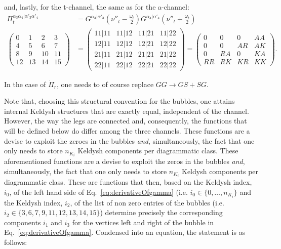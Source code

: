 \documentclass[12pt,a4paper,roman]{article}
\begin{document}
and, lastly, for the t-channel, the same as for the a-channel:
\begin{align}
\Pi_t^{\alpha_3\alpha_4|\alpha'_3\alpha'_4} &= G^{\alpha_3|\alpha'_3}\left(\nu''_t-\frac{\omega_t}{2}\right)G^{\alpha_4|\alpha'_4}\left(\nu''_t+\frac{\omega_t}{2}\right)\\
\begin{pmatrix}
0  & 1  & 2   & 3\\
4  & 5  & 6   & 7\\
8  & 9  & 10 & 11\\
12& 13&14 & 15
\end{pmatrix} &=
\begin{pmatrix}
11|11 & 11|12 & 11|21 & 11|22 \\
12|11 & 12|12 & 12|21 & 12|22\\
21|11 & 21|12 & 21|21 & 21|22\\
22|11 & 22|12 & 22|21 & 22|22
\end{pmatrix} = \begin{pmatrix}
0    & 0    & 0    & AA \\
0    & 0    & AR & AK\\
0    & RA & 0    & KA\\
RR & RK & KR & KK
\end{pmatrix}.
\label{eq:Pit}
\end{align}

In the case of $\dot{\Pi}_r$, one needs to of course replace $GG \rightarrow GS+SG$.

Note that, choosing this structural convention for the bubbles, one attains internal Keldysh structures that are exactly equal, independent of the channel. However, the way the legs are connected and, consequently, the functions that will be defined below do differ among the three channels. These functions are a devise to exploit the zeroes in the bubbles \textit{and}, simultaneously, the fact that one only needs to store $n_{K_i}$ Keldysh components per diagrammatic class.
These aforementioned functions are a devise to exploit the zeros in the bubbles \textit{and}, simultaneously, the fact that one only needs to store $n_{K_i}$ Keldysh components per diagrammatic class. These are functions that then, based on the Keldysh index, $i_0$, of the left hand side of Eq.~\eqref{eq:derivativeOfgamma} (i.e. $i_0\in\{0,\dots, n_{K_i}\}$ and the Keldysh index, $i_2$, of the list of non zero entries of the bubbles (i.e. $i_2\in\{3, 6, 7, 9, 11, 12, 13, 14, 15\}$)  determine precisely the corresponding components $i_1$ and $i_3$ for the vertices left and right of the bubble in Eq.~\eqref{eq:derivativeOfgamma}. Condensed into an equation, the statement is as follows:
\end{document}
